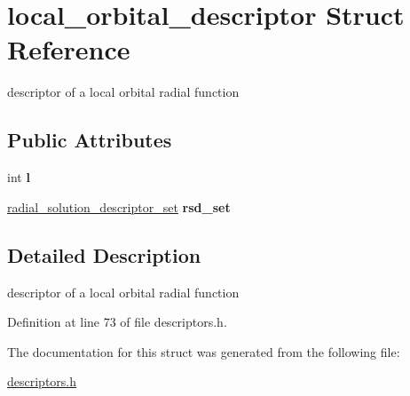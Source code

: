 \hypertarget{structlocal__orbital__descriptor}{}\section{local\+\_\+orbital\+\_\+descriptor Struct Reference}
\label{structlocal__orbital__descriptor}


descriptor of a local orbital radial function  


\subsection*{Public Attributes}
\begin{DoxyCompactItemize}
\item 
\hypertarget{structlocal__orbital__descriptor_af7230f942b0a7fea1328b8ba180b4043}{}int {\bfseries l}\label{structlocal__orbital__descriptor_af7230f942b0a7fea1328b8ba180b4043}

\item 
\hypertarget{structlocal__orbital__descriptor_ad5ff5231467b4a6eec11fd155fd2b8a6}{}\hyperlink{descriptors_8h_aec4b6e691d842d5c6b06552800a478b3}{radial\+\_\+solution\+\_\+descriptor\+\_\+set} {\bfseries rsd\+\_\+set}\label{structlocal__orbital__descriptor_ad5ff5231467b4a6eec11fd155fd2b8a6}

\end{DoxyCompactItemize}


\subsection{Detailed Description}
descriptor of a local orbital radial function 

Definition at line 73 of file descriptors.\+h.



The documentation for this struct was generated from the following file\+:\begin{DoxyCompactItemize}
\item 
\hyperlink{descriptors_8h}{descriptors.\+h}\end{DoxyCompactItemize}
